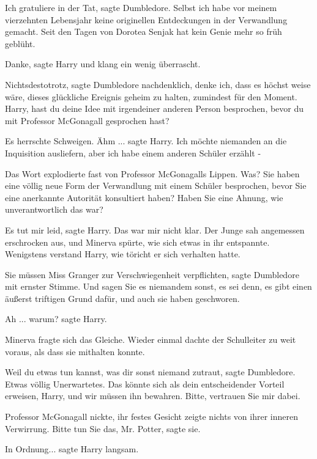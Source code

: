 \glqq Ich gratuliere in der Tat\grqq{}, sagte Dumbledore. \glqq Selbst ich habe
vor meinem vierzehnten Lebensjahr keine originellen Entdeckungen in der
Verwandlung gemacht. Seit den Tagen von Dorotea Senjak hat kein Genie mehr so
früh geblüht.\grqq{}

\glqq Danke\grqq{}, sagte Harry und klang ein wenig überrascht.

\glqq Nichtsdestotrotz\grqq{}, sagte Dumbledore nachdenklich, \glqq denke ich,
dass es höchst weise wäre, dieses glückliche Ereignis geheim zu halten,
zumindest für den Moment. Harry, hast du deine Idee mit irgendeiner anderen
Person besprochen, bevor du mit Professor McGonagall gesprochen hast?\grqq{}

Es herrschte Schweigen. \glqq Ähm ...\grqq{} sagte Harry. \glqq Ich möchte
niemanden an die Inquisition ausliefern, aber ich habe einem anderen Schüler
erzählt -\grqq{}

Das Wort explodierte fast von Professor McGonagalls Lippen. \glqq Was? Sie haben
eine völlig neue Form der Verwandlung mit einem Schüler besprochen, bevor Sie
eine anerkannte Autorität konsultiert haben? Haben Sie eine Ahnung, wie
unverantwortlich das war?\grqq{}

\glqq Es tut mir leid\grqq{}, sagte Harry. \glqq Das war mir nicht klar.\grqq{}
Der Junge sah angemessen erschrocken aus, und Minerva spürte, wie sich etwas in
ihr entspannte. Wenigstens verstand Harry, wie töricht er sich verhalten hatte.

\glqq Sie müssen Miss Granger zur Verschwiegenheit verpflichten\grqq{}, sagte
Dumbledore mit ernster Stimme. \glqq Und sagen Sie es niemandem sonst, es sei
denn, es gibt einen äußerst triftigen Grund dafür, und auch sie haben
geschworen.\grqq{}

\glqq Ah ... warum?\grqq{} sagte Harry.

Minerva fragte sich das Gleiche. Wieder einmal dachte der Schulleiter zu weit
voraus, als dass sie mithalten konnte.

\glqq Weil du etwas tun kannst, was dir sonst niemand zutraut\grqq{}, sagte
Dumbledore. \glqq Etwas völlig Unerwartetes. Das könnte sich als dein
entscheidender Vorteil erweisen, Harry, und wir müssen ihn bewahren. Bitte,
vertrauen Sie mir dabei.\grqq{}

Professor McGonagall nickte, ihr festes Gesicht zeigte nichts von ihrer inneren
Verwirrung. \glqq Bitte tun Sie das, Mr. Potter\grqq{}, sagte sie.

\glqq In Ordnung...\grqq{} sagte Harry langsam.

